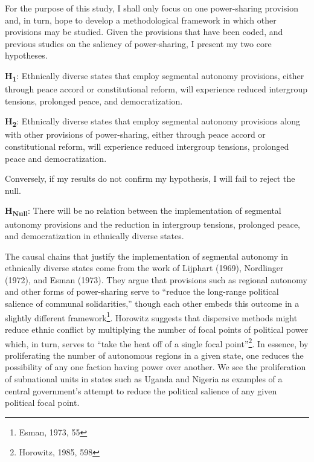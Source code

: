 \documentclass[12pt]{article}
\begin{document}
For the purpose of this study, I shall only focus on one power-sharing provision and, in turn, hope to develop a methodological framework in which other provisions may be studied. Given the provisions that have been coded, and previous studies on the saliency of power-sharing, I present my two core hypotheses.

\singlespacing
\textbf{H\textsubscript{1}}: Ethnically diverse states that employ segmental autonomy provisions, either through peace accord or constitutional reform, will experience reduced intergroup tensions, prolonged peace, and democratization.

\bigskip

\textbf{H\textsubscript{2}}: Ethnically diverse states that employ segmental autonomy provisions along with other provisions of power-sharing, either through peace accord or constitutional reform, will experience reduced intergroup tensions, prolonged peace and democratization. 

\doublespacing
Conversely, if my results do not confirm my hypothesis, I will fail to reject the null. 

\singlespacing
\textbf{H\textsubscript{Null}}: There will be no relation between the implementation of segmental autonomy provisions and the reduction in intergroup tensions, prolonged peace, and democratization in ethnically diverse states. 

\doublespacing
The causal chains that justify the implementation of segmental autonomy in ethnically diverse states come from the work of Lijphart (1969), Nordlinger (1972), and Esman (1973). They argue that provisions such as regional autonomy and other forms of power-sharing serve to “reduce the long-range political salience of communal solidarities,” though each other embeds this outcome in a slightly different framework\footnote{Esman, 1973, 55}. Horowitz suggests that dispersive methods might reduce ethnic conflict by multiplying the number of focal points of political power which, in turn, serves to “take the heat off of a single focal point”\footnote{Horowitz, 1985, 598}. In essence, by proliferating the number of autonomous regions in a given state, one reduces the possibility of any one faction having power over another. We see the proliferation of subnational units in states such as Uganda and Nigeria as examples of a central government’s attempt to reduce the political salience of any given political focal point. 
\end{document}
